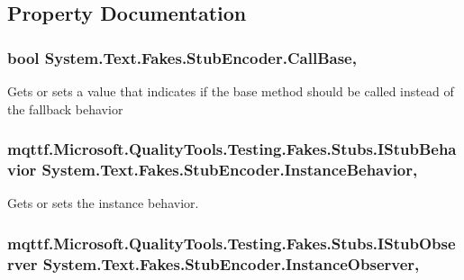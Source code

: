 \subsection{Property Documentation}
\hypertarget{class_system_1_1_text_1_1_fakes_1_1_stub_encoder_a9cff8d76e7092ed104426d4dda329f25}{
\subsubsection[{Call\-Base}]{\setlength{\rightskip}{0pt plus 5cm}bool System.\-Text.\-Fakes.\-Stub\-Encoder.\-Call\-Base\hspace{0.3cm}{\ttfamily [get]}, {\ttfamily [set]}}}\label{class_system_1_1_text_1_1_fakes_1_1_stub_encoder_a9cff8d76e7092ed104426d4dda329f25}


Gets or sets a value that indicates if the base method should be called instead of the fallback behavior

\hypertarget{class_system_1_1_text_1_1_fakes_1_1_stub_encoder_aca6d8fe3bee2aaf14367e3fc7be4ec6a}{
\subsubsection[{Instance\-Behavior}]{\setlength{\rightskip}{0pt plus 5cm}mqttf.\-Microsoft.\-Quality\-Tools.\-Testing.\-Fakes.\-Stubs.\-I\-Stub\-Behavior System.\-Text.\-Fakes.\-Stub\-Encoder.\-Instance\-Behavior\hspace{0.3cm}{\ttfamily [get]}, {\ttfamily [set]}}}\label{class_system_1_1_text_1_1_fakes_1_1_stub_encoder_aca6d8fe3bee2aaf14367e3fc7be4ec6a}


Gets or sets the instance behavior.

\hypertarget{class_system_1_1_text_1_1_fakes_1_1_stub_encoder_ab7b326c3abdb655eb1b68b0a4c507222}{
\subsubsection[{Instance\-Observer}]{\setlength{\rightskip}{0pt plus 5cm}mqttf.\-Microsoft.\-Quality\-Tools.\-Testing.\-Fakes.\-Stubs.\-I\-Stub\-Observer System.\-Text.\-Fakes.\-Stub\-Encoder.\-Instance\-Observer\hspace{0.3cm}{\ttfamily [get]}, {\ttfamily [set]}}}\label{class_system_1_1_text_1_1_fakes_1_1_stub_encoder_ab7b326c3abdb655eb1b68b0a4c507222}


